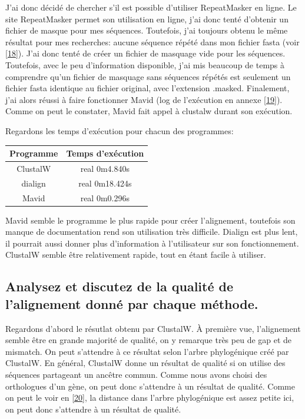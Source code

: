 \documentclass[11pt]{article} %
\begin{document}
J'ai donc décidé de chercher s'il est possible d'utiliser RepeatMasker en ligne. Le site RepeatMasker permet
son utilisation en ligne, j'ai donc tenté d'obtenir un fichier de masque pour mes séquences. Toutefois, j'ai
toujours obtenu le même résultat pour mes recherches: aucune séquence répété dans mon fichier fasta (voir \ref{18}).
J'ai donc tenté de créer un fichier de masquage vide pour les séquences. Toutefois, avec le peu d'information disponible,
j'ai mis beaucoup de temps à comprendre qu'un fichier de masquage sans séquences répétés est seulement un fichier
fasta identique au fichier original, avec l'extension .masked. Finalement, j'ai alors réussi à faire fonctionner
Mavid (log de l'exécution en annexe \ref{19}). Comme on peut le constater, Mavid fait appel à clustalw durant son
exécution.

Regardons les temps d'exécution pour chacun des programmes:
\begin{tabular}{|c|c|}
 \hline
 Programme & Temps d'exécution \\
 \hline
 ClustalW & real 0m4.840s \\
 \hline
 dialign & real 0m18.424s \\
 \hline
 Mavid & real 0m0.296s\\
 \hline
\end{tabular}

Mavid semble le programme le plus rapide pour créer l'alignement, toutefois son manque de documentation rend son utilisation
très difficile. Dialign est plus lent, il pourrait aussi donner plus d'information à l'utilisateur sur son fonctionnement.
ClustalW semble être relativement rapide, tout en étant facile à utiliser.

\subsection[Qualité des alignements]{Analysez et discutez de la qualité de l'alignement donné par chaque méthode.}

Regardons d'abord le résutlat obtenu par ClustalW. À première vue, l'alignement semble être en grande majorité de qualité,
on y remarque très peu de gap et de mismatch. On peut s'attendre à ce résultat selon l'arbre phylogénique
créé par ClustalW. En général, ClustalW donne un résultat de qualité si on utilise des séquences partageant un ancêtre commun.
Comme nous avons choisi des orthologues d'un gène, on peut donc s'attendre à un résultat de qualité. Comme on peut le voir en
\ref{20}, la distance dans l'arbre phylogénique est assez petite ici, on peut donc s'attendre à un résultat de qualité.
\end{document}
